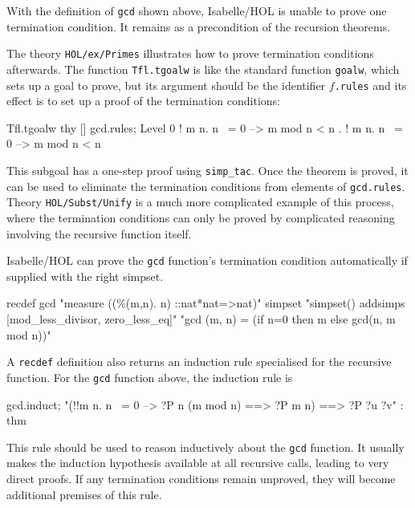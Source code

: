 With the definition of \texttt{gcd} shown above, Isabelle/HOL is unable to
prove one termination condition.  It remains as a precondition of the
recursion theorems.
The theory \texttt{HOL/ex/Primes} illustrates how to prove termination
conditions afterwards.  The function \texttt{Tfl.tgoalw} is like the standard
function \texttt{goalw}, which sets up a goal to prove, but its argument
should be the identifier $f$\texttt{.rules} and its effect is to set up a
proof of the termination conditions:
\begin{ttbox}
Tfl.tgoalw thy [] gcd.rules;
{\out Level 0}
{\out ! m n. n ~= 0 --> m mod n < n}
{. ! m n. n ~= 0 --> m mod n < n}
\end{ttbox}
This subgoal has a one-step proof using \texttt{simp_tac}.  Once the theorem
is proved, it can be used to eliminate the termination conditions from
elements of \texttt{gcd.rules}.  Theory \texttt{HOL/Subst/Unify} is a much
more complicated example of this process, where the termination conditions can
only be proved by complicated reasoning involving the recursive function
itself.

Isabelle/HOL can prove the \texttt{gcd} function's termination condition
automatically if supplied with the right simpset.
\begin{ttbox}
recdef gcd "measure ((\%(m,n). n) ::nat*nat=>nat)"
  simpset "simpset() addsimps [mod_less_divisor, zero_less_eq]"
    "gcd (m, n) = (if n=0 then m else gcd(n, m mod n))"
\end{ttbox}

A \texttt{recdef} definition also returns an induction rule specialised for
the recursive function.  For the \texttt{gcd} function above, the induction
rule is
\begin{ttbox}
gcd.induct;
{\out "(!!m n. n ~= 0 --> ?P n (m mod n) ==> ?P m n) ==> ?P ?u ?v" : thm}
\end{ttbox}
This rule should be used to reason inductively about the \texttt{gcd}
function.  It usually makes the induction hypothesis available at all
recursive calls, leading to very direct proofs.  If any termination conditions
remain unproved, they will become additional premises of this rule.



